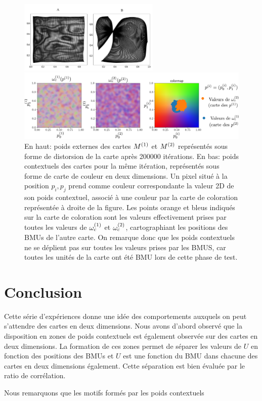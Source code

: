 \documentclass[../main]{subfiles}
\begin{document}
\begin{figure}
	\begin{minipage}{\textwidth}
		\centering\includegraphics[width=0.6\textwidth]{we_cub_example.pdf}
	\end{minipage}
	\begin{minipage}{\textwidth}
		\includegraphics[width=\textwidth]{wc_cub_legend.pdf}
		\caption{En haut: poids externes des cartes $M^{({1})}$ et $M^{({2})}$ représentés sous forme de distorsion de la carte après 200000 itérations.
	En bas: poids contextuels des cartes pour la même itération, représentés sous forme de carte de couleur en deux dimensions. Un pixel situé à la position $p_i,p_j$ prend comme couleur correspondante la valeur 2D de son poids contextuel, associé à une couleur par la carte de coloration représentée à droite de la figure.
	Les points orange et bleus indiqués sur la carte de coloration sont les valeurs effectivement prises par toutes les valeurs de $\omega_c^{(1)}$ et $\omega_c^{(2)}$, cartographiant les positions des BMUs de l'autre carte.
	On remarque donc que les poids contextuels ne se déplient pas sur toutes les valeurs prises par les BMUS, car toutes les unités de la carte ont été BMU lors de cette phase de test.\label{fig:2som_cub_wc}}
	\end{minipage}
\end{figure}


\section{Conclusion}

Cette série d'expériences donne une idée des comportements auxquels on peut s'attendre des cartes en deux dimensions.
Nous avons d'abord observé que la disposition en zones de poids contextuels est également observée sur des cartes en deux dimensions. 
La formation de ces zones permet de séparer les valeurs de $U$ en fonction des positions des BMUs et $U$ est une fonction du BMU dans chacune des cartes en deux dimensions également.
Cette séparation est bien évaluée par le ratio de corrélation.

Nous remarquons que les motifs formés par les poids contextuels 

\ifSubfilesClassLoaded{
    \printbibliography
}{}
\end{document}
